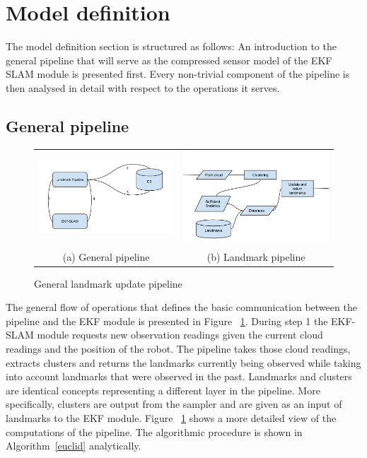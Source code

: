 \documentclass [twoside,hidelinks]{article}
\begin{document}
\newpage
\section{Model definition}
\label{sec:model}

The model definition section is structured as follows: An introduction to the general pipeline that will serve as the compressed sensor model of the EKF SLAM module is presented first. Every non-trivial component of the pipeline is then analysed in detail with respect to the operations it serves.

\subsection{General pipeline}

\begin{figure}
\begin{tabular}{cc}
  \includegraphics [width=.33\textwidth]{workflowGen} &    \includegraphics [width=.33\textwidth]{workflowSpec} \\
 (a) General pipeline &  (b) Landmark pipeline \\ [6pt]
\end{tabular}
\caption{General landmark update pipeline}
\label{pipeline}
\end{figure}


The general flow of operations that defines the basic communication between the pipeline and the EKF module is presented in Figure ~\ref{pipeline}. During step 1 the EKF-SLAM module requests new observation readings given the current cloud readings and the position of the robot. The pipeline takes those cloud readings, extracts clusters and returns the landmarks currently being observed while taking into account landmarks that were observed in the past. Landmarks and clusters are identical concepts representing a different layer in the pipeline. More specifically, clusters are output from the sampler and are given as an input of landmarks to the EKF module. Figure ~\ref{pipeline} shows a more detailed view of the computations of the pipeline. The algorithmic procedure is shown in Algorithm~\ref{euclid} analytically.
\end{document}
